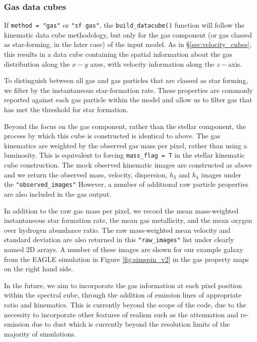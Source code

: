 \documentclass[
  journal=pasa,
  manuscript=research-paper, %
  year=2020,
  volume=37,
]{cup-journal}
\newcommand{\builddatacube}[1]{\texttt{build\_datacube()}#1}
\begin{document}
\subsubsection{Gas data cubes}
If \texttt{method = "gas"} or \texttt{"sf gas"}, the \builddatacube{} function will follow the kinematic data cube methodology, but only for the gas component (or gas classed as star-forming, in the later case) of the input model. 
As in \S\ref{sec:velocity_cubes}, this results in a data cube containing the spatial information about the gas distribution along the $x-y$ axes, with velocity information along the $z-$axis.

To distinguish between all gas and gas particles that are classed as star forming, we filter by the instantaneous star-formation rate.
These properties are commonly reported against each gas particle within the model and allow us to filter gas that has met the threshold for star formation. 

Beyond the focus on the gas component, rather than the stellar component, the process by which this cube is constructed is identical to above. 
The gas kinematics are weighted by the observed gas mass per pixel, rather than using a luminosity. 
This is equivalent to forcing \texttt{mass\_flag = T} in the stellar kinematic cube construction.
The mock observed kinematic images are constructed as above and we return the observed mass, velocity, dispersion, $h_3$ and $h_4$ images under the \texttt{"observed\_images"}
However, a number of additional raw particle properties are also included in the gas output. 

In addition to the raw gas mass per pixel, we record the mean mass-weighted instantaneous star formation rate, the mean gas metallicity, and the mean oxygen over hydrogen abundance ratio. 
The raw mass-weighted mean velocity and standard deviation are also returned in this \texttt{"raw\_images"} list under clearly named 2D arrays. 
A number of these images are shown for our example galaxy from the EAGLE simulation in Figure \ref{fig:simspin_v2} in the gas property maps on the right hand side.

In the future, we aim to incorporate the gas information at each pixel position within the spectral cube, through the addition of emission lines of appropriate ratio and kinematics.
This is currently beyond the scope of the code, due to the necessity to incorporate other features of realism such as the attenuation and re-emission due to dust which is currently beyond the resolution limits of the majority of simulations. 
\end{document}
